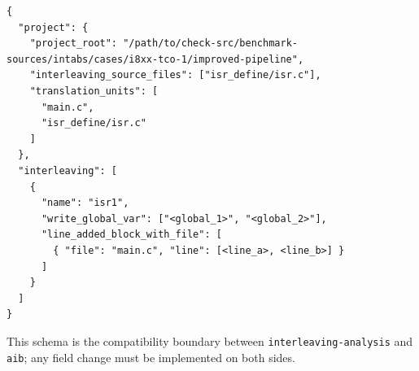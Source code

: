 \begin{lstlisting}[caption={Schematic manifest excerpt.}]
{
  "project": {
    "project_root": "/path/to/check-src/benchmark-sources/intabs/cases/i8xx-tco-1/improved-pipeline",
    "interleaving_source_files": ["isr_define/isr.c"],
    "translation_units": [
      "main.c",
      "isr_define/isr.c"
    ]
  },
  "interleaving": [
    {
      "name": "isr1",
      "write_global_var": ["<global_1>", "<global_2>"],
      "line_added_block_with_file": [
        { "file": "main.c", "line": [<line_a>, <line_b>] }
      ]
    }
  ]
}
\end{lstlisting}

This schema is the compatibility boundary between \texttt{interleaving-analysis} and
\texttt{aib}; any field change must be implemented on both sides.
